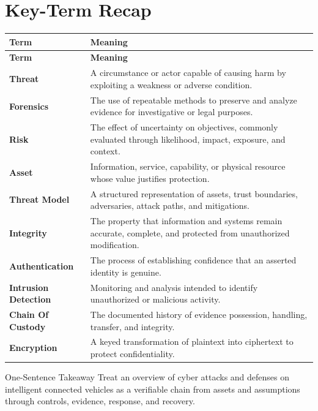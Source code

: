 \documentclass[11pt,letterpaper]{article}
\begin{document}
\section*{Key-Term Recap}
\begin{longtable}{>{\raggedright\arraybackslash}p{}>{\raggedright\arraybackslash}p{}}
\toprule\rowcolor{Navy}\color{white}\textbf{Term} & \color{white}\textbf{Meaning}\\\midrule
\endfirsthead
\toprule\rowcolor{Navy}\color{white}\textbf{Term} & \color{white}\textbf{Meaning}\\\midrule
\endhead
\textbf{Threat} & A circumstance or actor capable of causing harm by exploiting a weakness or adverse condition. \\\midrule
\textbf{Forensics} & The use of repeatable methods to preserve and analyze evidence for investigative or legal purposes. \\\midrule
\textbf{Risk} & The effect of uncertainty on objectives, commonly evaluated through likelihood, impact, exposure, and context. \\\midrule
\textbf{Asset} & Information, service, capability, or physical resource whose value justifies protection. \\\midrule
\textbf{Threat Model} & A structured representation of assets, trust boundaries, adversaries, attack paths, and mitigations. \\\midrule
\textbf{Integrity} & The property that information and systems remain accurate, complete, and protected from unauthorized modification. \\\midrule
\textbf{Authentication} & The process of establishing confidence that an asserted identity is genuine. \\\midrule
\textbf{Intrusion Detection} & Monitoring and analysis intended to identify unauthorized or malicious activity. \\\midrule
\textbf{Chain Of Custody} & The documented history of evidence possession, handling, transfer, and integrity. \\\midrule
\textbf{Encryption} & A keyed transformation of plaintext into ciphertext to protect confidentiality. \\\midrule
\bottomrule
\end{longtable}
\begin{CornellExamBox}{One-Sentence Takeaway}
Treat an overview of cyber attacks and defenses on intelligent connected vehicles as a verifiable chain from assets and assumptions through controls, evidence, response, and recovery.
\end{CornellExamBox}
\end{document}
